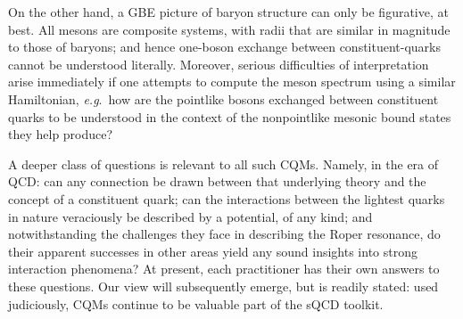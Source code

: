 On the other hand, a GBE picture of baryon structure can only be figurative, at best.  All mesons are composite systems, with radii that are similar in magnitude to those of baryons; and hence one-boson exchange between constituent-quarks cannot be understood literally.  Moreover, serious difficulties of interpretation arise immediately if one attempts to compute the meson spectrum using a similar Hamiltonian, \emph{e.g}.\ how are the pointlike bosons exchanged between constituent quarks to be understood in the context of the nonpointlike mesonic bound states they help produce?

A deeper class of questions is relevant to all such CQMs.  Namely, in the era of QCD: can any connection be drawn between that underlying theory and the concept of a constituent quark; can the interactions between the lightest quarks in nature veraciously be described by a potential, of any kind; and notwithstanding the challenges they face in describing the Roper resonance, do their apparent successes in other areas yield any sound insights into strong interaction phenomena?  At present, each practitioner has their own answers to these questions.  Our view will subsequently emerge, but is readily stated: used judiciously, CQMs continue to be valuable part of the sQCD toolkit.

